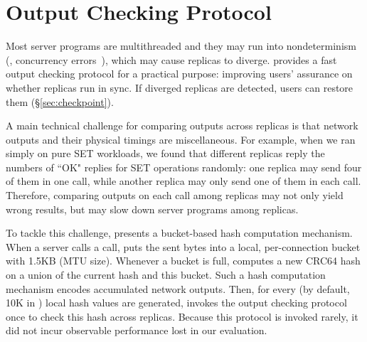\section{Output Checking Protocol} \label{sec:output}

Most server programs are multithreaded and they may run into nondeterminism 
(\eg, concurrency errors~\cite{lu:concurrency-bugs}), which may cause replicas 
to diverge. \xxx provides a fast output checking protocol for a practical 
purpose: improving \xxx users' assurance on whether replicas run in sync. If 
diverged replicas are detected, users can restore them 
(\S\ref{sec:checkpoint}).

% 

A main technical challenge for comparing outputs across replicas is that 
network outputs and their physical timings are miscellaneous. For example, when 
we ran \redis simply on pure SET workloads, we found that different replicas 
reply the numbers of ``OK" replies for SET operations randomly: one replica may 
send four of them in one \send call, while another replica may only send one of 
them in each \send call. Therefore, comparing outputs on each \send call among 
replicas may not only yield wrong results, but may slow down server programs 
among replicas.

To tackle this challenge, \xxx presents a bucket-based hash computation 
mechanism. When a server calls a \send call, \xxx puts the sent bytes into a 
local, per-connection bucket with 1.5KB (MTU size). Whenever a bucket 
is full, \xxx computes a new CRC64 hash on a union of the current hash and this 
bucket. Such a hash computation mechanism encodes accumulated network outputs. 
Then, for every \thashcomp (by default, 10K in \xxx) local hash values 
are generated, \xxx invokes the output checking protocol once to check this 
hash across replicas. Because this protocol is invoked rarely, it did not incur 
observable performance lost in our evaluation.

